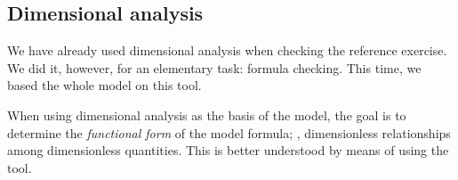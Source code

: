 \subsection{Dimensional analysis}\label{sec:dimanalysis}
%
We
%
%
have already used dimensional analysis when checking the reference exercise. We did it, however, for an elementary task: formula checking. This time, we based the whole model on this tool.

When using dimensional analysis as the basis of the model, the goal is to determine the \emph{functional form} of the model formula; \ie, dimensionless relationships among dimensionless quantities. This is better understood by means of using the tool. 

